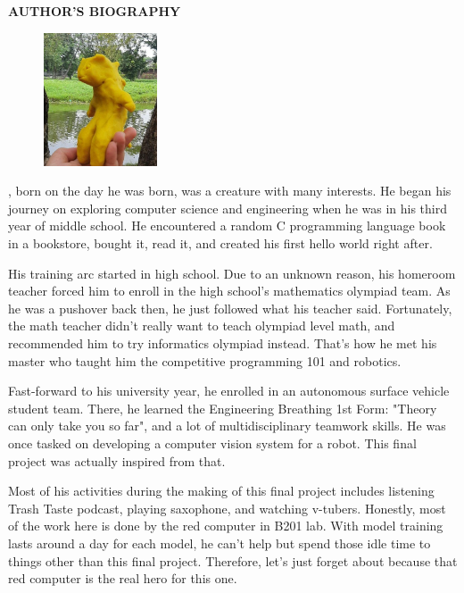 \begin{center}
  \Large
  \textbf{AUTHOR'S BIOGRAPHY}
\end{center}


\vspace{2ex}

\begin{figure}
  \centering
  \vspace{-3ex}
  \includegraphics[width=0.3\textwidth]{figures/yellow.png}
  \vspace{-4ex}
\end{figure}

\name{}, born on the day he was born, was a creature with many interests.
He began his journey on exploring computer science and engineering when he was in his third year of middle school.
He encountered a random C programming language book in a bookstore, bought it, read it, and created his first hello world right after.

His training arc started in high school. 
Due to an unknown reason, his homeroom teacher forced him to enroll in the high school's mathematics olympiad team.
As he was a pushover back then, he just followed what his teacher said.
Fortunately, the math teacher didn't really want to teach olympiad level math, and recommended him to try informatics olympiad instead.
That's how he met his master who taught him the competitive programming 101 and robotics.

Fast-forward to his university year, he enrolled in an autonomous surface vehicle student team.
There, he learned the Engineering Breathing 1st Form: "Theory can only take you so far", and a lot of multidisciplinary teamwork skills. 
He was once tasked on developing a computer vision system for a robot. This final project was actually
inspired from that.

Most of his activities during the making of this final project includes listening Trash Taste podcast,
playing saxophone, and watching v-tubers. 
Honestly, most of the work here is done by the red computer in B201 lab.
With model training lasts around a day for each model, he can't help but spend those idle time to things other than this final project.
Therefore, let's just forget about \name{} because that red computer is the real hero for this one.


